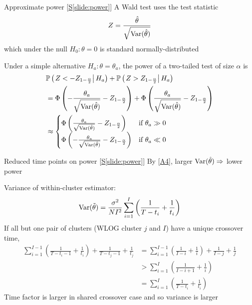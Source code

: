 \documentclass[9pt]{beamer}
\begin{document}
\addtocounter{framenumber}{-1}
\begin{frame}{Approximate power [\hyperlink{slide:power}{S\ref{slide:power}}]} \label{apx:power}
A Wald test uses the test statistic
\[
Z = \frac{\hat{\theta}}{\sqrt{\mathrm{Var}(\hat{\theta})}}
\]
which under the null $H_0:\theta=0$ is standard normally-distributed
\vspace{2em}

Under a simple alternative $H_a:\theta=\theta_a$, the power of a two-tailed test of size $\alpha$ is
\begin{align*}
&\mathbb{P}\left(\left.Z<-Z_{1-\frac{\alpha}{2}}\right|H_a\right) + \mathbb{P}\left(\left.Z>Z_{1-\frac{\alpha}{2}}\right|H_a\right) \\
&= \Phi\left(-\frac{\theta_a}{\sqrt{\mathrm{Var}(\hat{\theta})}}-Z_{1-\frac{\alpha}{2}}\right) + \Phi\left(\frac{\theta_a}{\sqrt{\mathrm{Var}(\hat{\theta})}} - Z_{1-\frac{\alpha}{2}}\right) \\
&\approx \begin{cases}
\Phi\left(\frac{\theta_a}{\sqrt{\mathrm{Var}(\hat{\theta})}} - Z_{1-\frac{\alpha}{2}}\right) & \text{if } \theta_a \gg 0 \\
\Phi\left(-\frac{\theta_a}{\sqrt{\mathrm{Var}(\hat{\theta})}}-Z_{1-\frac{\alpha}{2}}\right) & \text{if } \theta_a \ll 0
\end{cases}
\end{align*}
\end{frame}



\addtocounter{framenumber}{-1}
\begin{frame}{Reduced time points on power [\hyperlink{slide:power}{S\ref{slide:power}}]} \label{apx:timepoints}
By [\hyperlink{apx:power}{A4}], larger $\mathrm{Var}(\hat{\theta})\Rightarrow$ lower power
\vspace{2em}

Variance of within-cluster estimator:
\[
\mathrm{Var}(\tilde{\theta}) = \frac{\sigma^2}{NI^2}\sum_{i=1}^I\left(\frac{1}{T-t_i} + \frac{1}{t_i}\right)
\]
If all but one pair of clusters (WLOG cluster $j$ and $I$) have a unique crossover time,
\begin{align*}
\sum_{i=1}^{I-1}\left(\frac{1}{T-t_i-1} + \frac{1}{t_i}\right) + \frac{1}{T-t_j-1} + \frac{1}{t_j} &= \sum_{i=1}^{I-1}\left(\frac{1}{I-i} + \frac{1}{i}\right) + \frac{1}{I-j} + \frac{1}{j} \\
&> \sum_{i=1}^I\left(\frac{1}{I-i+1}+\frac{1}{i}\right) \\
&= \sum_{i=1}^I\left(\frac{1}{T-t_i}+\frac{1}{t_i}\right)
\end{align*}
Time factor is larger in shared crossover case and so variance is larger
\end{frame}
\end{document}
